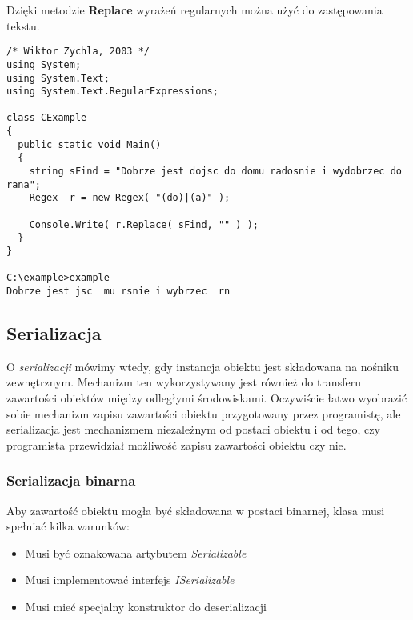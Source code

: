 Dzięki metodzie {\bf Replace} wyrażeń regularnych można użyć do zastępowania tekstu.

\begin{scriptsize}
\begin{verbatim}
/* Wiktor Zychla, 2003 */
using System;
using System.Text;
using System.Text.RegularExpressions;

class CExample 
{
  public static void Main()
  {
    string sFind = "Dobrze jest dojsc do domu radosnie i wydobrzec do rana";
    Regex  r = new Regex( "(do)|(a)" );

    Console.Write( r.Replace( sFind, "" ) );
  }  
}

C:\example>example
Dobrze jest jsc  mu rsnie i wybrzec  rn
\end{verbatim}
\end{scriptsize}

\subsection{Serializacja}
\label{csSerializacja}

O {\em serializacji} mówimy wtedy, gdy instancja obiektu jest składowana na nośniku zewnętrznym.
Mechanizm ten wykorzystywany jest również do transferu zawartości obiektów między odległymi środowiskami.
Oczywiście łatwo wyobrazić sobie mechanizm zapisu zawartości obiektu przygotowany przez programistę,
ale serializacja jest mechanizmem niezależnym od postaci obiektu i od tego, czy programista przewidział
możliwość zapisu zawartości obiektu czy nie. 

\subsubsection{Serializacja binarna}

Aby zawartość obiektu mogła być składowana w postaci binarnej, klasa musi spełniać kilka warunków:
\begin{itemize}
\item Musi być oznakowana artybutem {\em Serializable}
\item Musi implementować interfejs {\em ISerializable}
\item Musi mieć specjalny konstruktor do deserializacji
\end{itemize}

